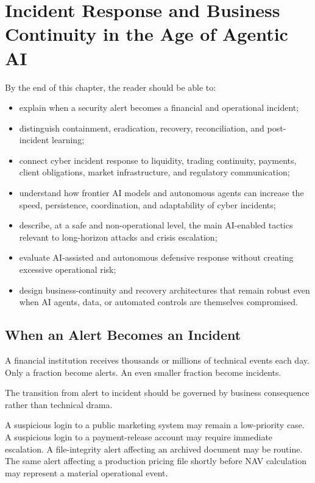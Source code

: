 \chapter{Incident Response and Business Continuity in the Age of Agentic AI}

\begin{learningobjectives}
By the end of this chapter, the reader should be able to:
\begin{itemize}
    \item explain when a security alert becomes a financial and operational incident;
    \item distinguish containment, eradication, recovery, reconciliation, and post-incident learning;
    \item connect cyber incident response to liquidity, trading continuity, payments, client obligations, market infrastructure, and regulatory communication;
    \item understand how frontier AI models and autonomous agents can increase the speed, persistence, coordination, and adaptability of cyber incidents;
    \item describe, at a safe and non-operational level, the main AI-enabled tactics relevant to long-horizon attacks and crisis escalation;
    \item evaluate AI-assisted and autonomous defensive response without creating excessive operational risk;
    \item design business-continuity and recovery architectures that remain robust even when AI agents, data, or automated controls are themselves compromised.
\end{itemize}
\end{learningobjectives}

\section{When an Alert Becomes an Incident}

A financial institution receives thousands or millions of technical events each day. Only a fraction become alerts. An even smaller fraction become incidents.

The transition from alert to incident should be governed by business consequence rather than technical drama.

A suspicious login to a public marketing system may remain a low-priority case. A suspicious login to a payment-release account may require immediate escalation. A file-integrity alert affecting an archived document may be routine. The same alert affecting a production pricing file shortly before NAV calculation may represent a material operational event.

